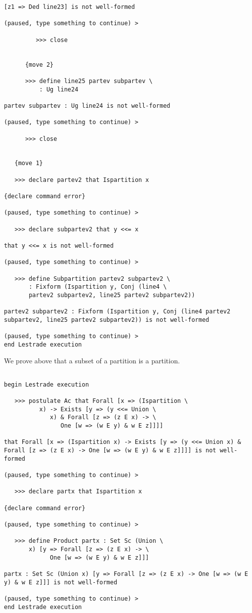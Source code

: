\documentclass[12pt]{article}
\begin{document}
\begin{verbatim}
[z1 => Ded line23] is not well-formed

(paused, type something to continue) >

         >>> close


      {move 2}

      >>> define line25 partev subpartev \
          : Ug line24

partev subpartev : Ug line24 is not well-formed

(paused, type something to continue) >

      >>> close


   {move 1}

   >>> declare partev2 that Ispartition x

{declare command error}

(paused, type something to continue) >

   >>> declare subpartev2 that y <<= x

that y <<= x is not well-formed

(paused, type something to continue) >

   >>> define Subpartition partev2 subpartev2 \
       : Fixform (Ispartition y, Conj (line4 \
       partev2 subpartev2, line25 partev2 subpartev2))

partev2 subpartev2 : Fixform (Ispartition y, Conj (line4 partev2 subpartev2, line25 partev2 subpartev2)) is not well-formed

(paused, type something to continue) >
end Lestrade execution
\end{verbatim}

We prove above that a subset of a partition is a partition.

\begin{verbatim}

begin Lestrade execution

   >>> postulate Ac that Forall [x => (Ispartition \
          x) -> Exists [y => (y <<= Union \
             x) & Forall [z => (z E x) -> \
                One [w => (w E y) & w E z]]]]

that Forall [x => (Ispartition x) -> Exists [y => (y <<= Union x) & Forall [z => (z E x) -> One [w => (w E y) & w E z]]]] is not well-formed

(paused, type something to continue) >

   >>> declare partx that Ispartition x

{declare command error}

(paused, type something to continue) >

   >>> define Product partx : Set Sc (Union \
       x) [y => Forall [z => (z E x) -> \
             One [w => (w E y) & w E z]]]

partx : Set Sc (Union x) [y => Forall [z => (z E x) -> One [w => (w E y) & w E z]]] is not well-formed

(paused, type something to continue) >
end Lestrade execution
\end{verbatim}
\end{document}
